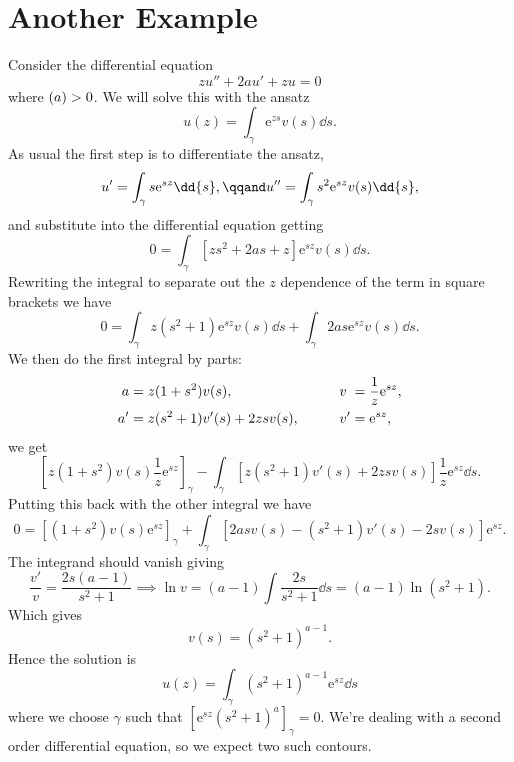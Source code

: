 \documentclass[fleqn]{NotesClass}
\newcommand*{\e}{\mathrm{e}}
\let\Re\relax
\DeclareMathOperator{\Re}{Re}
\begin{document}
    \section{Another Example}
    Consider the differential equation
    \begin{equation}
        zu'' + 2au' + zu = 0
    \end{equation}
    where \(\Re(a) > 0\).
    We will solve this with the ansatz
    \begin{equation}
        u(z) = \int_{\gamma} \e^{zs} v(s) \dd{s}.
    \end{equation}
    As usual the first step is to differentiate the ansatz,
    \begin{equation}
        u' = \int_{\gamma} s\e^{sz} \dd{s}, \qqand u'' = \int_{\gamma} s^2 \e^{sz} v(s) \dd{s},
    \end{equation}
    and substitute into the differential equation getting
    \begin{equation}
        0 = \int_{\gamma} [zs^2 + 2as + z] \e^{sz} v(s) \dd{s}.
    \end{equation}
    Rewriting the integral to separate out the \(z\) dependence of the term in square brackets we have
    \begin{equation}
        0 = \int_{\gamma} z(s^2 + 1)\e^{sz}v(s) \dd{s} + \int_{\gamma} 2as\e^{sz}v(s) \dd{s}.
    \end{equation}
    We then do the first integral by parts:
    \begin{alignat}{2}
        a &= z(1 + s^2)v(s), \qquad & v\hphantom{'} &= \frac{1}{z}\e^{sz},\\
        a' &= z(s^2 + 1)v'(s) + 2zsv(s), \qquad & v' &= \e^{sz},
    \end{alignat}
    we get
    \begin{equation}
        \left[ z(1 + s^2)v(s)\frac{1}{z}\e^{sz} \right]_{\gamma} - \int_{\gamma} [z(s^2 + 1)v'(s) + 2zsv(s)]\frac{1}{z}\e^{sz} \dd{s}.
    \end{equation}
    Putting this back with the other integral we have
    \begin{equation}
        0 = [(1 + s^2)v(s)\e^{sz}]_{\gamma} + \int_{\gamma} [2asv(s)-(s^2 + 1)v'(s) - 2sv(s)]\e^{sz}.
    \end{equation}
    The integrand should vanish giving
    \begin{equation}
        \frac{v'}{v} = \frac{2s(a - 1)}{s^2 + 1} \implies \ln v = (a - 1) \int \frac{2s}{s^2 + 1} \dd{s} = (a - 1) \ln (s^2 + 1).
    \end{equation}
    Which gives
    \begin{equation}
        v(s) = (s^2 + 1)^{a - 1}.
    \end{equation}
    Hence the solution is
    \begin{equation}
        u(z) = \int_{\gamma} (s^2 + 1)^{a - 1} \e^{sz} \dd{s}
    \end{equation}
    where we choose \(\gamma\) such that \([\e^{sz}(s^2 + 1)^a]_{\gamma} = 0\).
    We're dealing with a second order differential equation, so we expect two such contours.
    
\end{document}
